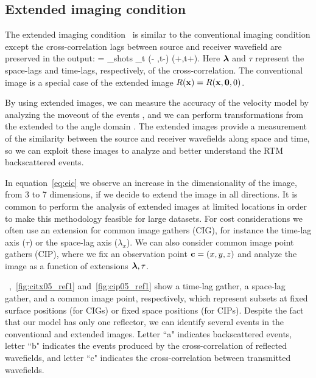 



\subsection{Extended imaging condition}

The extended imaging condition~\citep{rickett:883,sava:S209,GPR:GPR888} is similar to the conventional imaging condition
 except the cross-correlation lags between source and receiver wavefield are preserved in the output:
\beq
\Re= \sum_{shots} \sum_{t} \US(\xx - \hh,t-\tau) \UR(\xx+\hh,t+\tau).
\label{eq:eic}
\eeq
Here ${\boldsymbol{\lambda}}$ and $\tau$ represent the space-lags and time-lags, respectively, of the cross-correlation.
%
The conventional image is a special case of the extended image $R({\bf x})=R({\bf x},{\bf 0},0)$.

By using extended images, we can measure the accuracy of the velocity model by analyzing the moveout of the events
 \citep{yang:S151}, and we can perform transformations from the extended to the angle domain 
\citep{sava:1065,sava:S209,sava:S131}. The extended images provide a measurement of the similarity between the source
 and receiver wavefields along space and time, so we can exploit these images to analyze and better understand the RTM backscattered events.

In equation~\ref{eq:eic} we observe an increase in the dimensionality of the image, from 3 to 7 dimensions,
if we decide to extend the image in all directions. It is common to perform the analysis 
of extended images at limited locations in order to make this methodology feasible for large datasets. 
For cost considerations we often use an extension for common image gathers (CIG), for instance
 the time-lag axis ($\tau$) or the space-lag axis ($\lambda_x$). We can also consider common image point gathers (CIP), where we 
fix an observation point ${\bf c}=(x,y,z)$ and analyze the image as a function of extensions ${\boldsymbol{\lambda}},\tau$. 

~,~\ref{fig:citx05_ref1} and~\ref{fig:cip05_ref1} show a time-lag gather, a space-lag gather,
 and a common image point, respectively, which represent subsets at fixed surface positions (for CIGs) or fixed space positions 
(for CIPs). Despite the fact that our model has only one reflector, we can identify several events in the conventional and extended images. 
Letter ``a" indicates backscattered events, letter ``b" indicates the events produced by the cross-correlation of 
reflected wavefields, and letter ``c" indicates the cross-correlation between transmitted wavefields.

